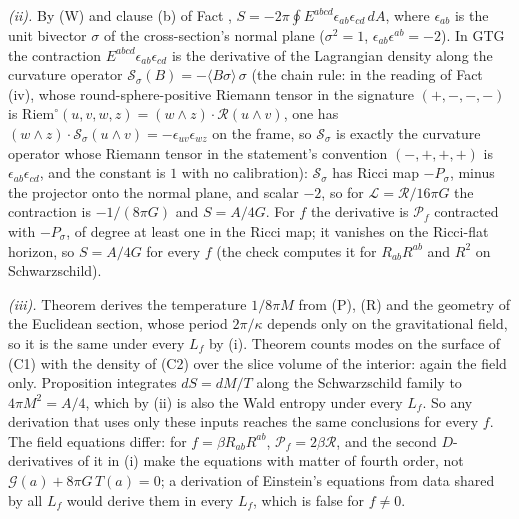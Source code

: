 \emph{(ii).} By (W) and clause (b) of Fact , $S = -2\pi\oint E^{abcd}\epsilon_{ab}\epsilon_{cd}\,dA$, where $\epsilon_{ab}$ is the unit bivector $\sigma$ of the cross-section's normal plane ($\sigma^{2} = 1$, $\epsilon_{ab}\epsilon^{ab} = -2$). In GTG the contraction $E^{abcd}\epsilon_{ab}\epsilon_{cd}$ is the derivative of the Lagrangian density along the curvature operator $\mathcal{S}_{\sigma}(B) = -\langle B\sigma\rangle\,\sigma$ (the chain rule: in the reading of Fact (iv), whose round-sphere-positive Riemann tensor in the signature $(+,-,-,-)$ is $\mathrm{Riem}^{\circ}(u, v, w, z) = (w \wedge z) \cdot \mathcal{R}(u \wedge v)$, one has $(w \wedge z) \cdot \mathcal{S}_{\sigma}(u \wedge v) = -\epsilon_{uv}\epsilon_{wz}$ on the frame, so $\mathcal{S}_{\sigma}$ is exactly the curvature operator whose Riemann tensor in the statement's convention $(-,+,+,+)$ is $\epsilon_{ab}\epsilon_{cd}$, and the constant is $1$ with no calibration): $\mathcal{S}_{\sigma}$ has Ricci map $-P_{\sigma}$, minus the projector onto the normal plane, and scalar $-2$, so for $\mathcal{L} = \mathcal{R}/16\pi G$ the contraction is $-1/(8\pi G)$ and $S = A/4G$. For $f$ the derivative is $\mathcal{P}_{f}$ contracted with $-P_{\sigma}$, of degree at least one in the Ricci map; it vanishes on the Ricci-flat horizon, so $S = A/4G$ for every $f$ (the check computes it for $R_{ab}R^{ab}$ and $R^{2}$ on Schwarzschild).

\emph{(iii).} Theorem  derives the temperature $1/8\pi M$ from (P), (R) and the geometry of the Euclidean section, whose period $2\pi/\kappa$ depends only on the gravitational field, so it is the same under every $L_{f}$ by (i). Theorem  counts modes on the surface of (C1) with the density of (C2) over the slice volume of the interior: again the field only. Proposition  integrates $dS = dM/T$ along the Schwarzschild family to $4\pi M^{2} = A/4$, which by (ii) is also the Wald entropy under every $L_{f}$. So any derivation that uses only these inputs reaches the same conclusions for every $f$. The field equations differ: for $f = \beta R_{ab}R^{ab}$, $\mathcal{P}_{f} = 2\beta\mathcal{R}$, and the second $D$-derivatives of it in (i) make the equations with matter of fourth order, not $\mathcal{G}(a) + 8\pi G\,T(a) = 0$; a derivation of Einstein's equations from data shared by all $L_{f}$ would derive them in every $L_{f}$, which is false for $f \neq 0$.

